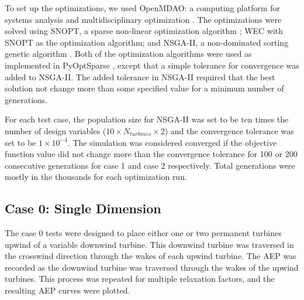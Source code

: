 \documentclass[a4paper]{jpconf}
\begin{document}
To set up the optimizations, we used OpenMDAO: a computing platform for systems analysis and multidisciplinary optimization \cite{gray2010_OpenMDAO}. The optimizations were solved using SNOPT, a sparse non-linear optimization algorithm \cite{gill2005}; WEC with SNOPT as the optimization algorithm; 
and NSGA-II, a non-dominated sorting genetic algorithm \cite{deb2002_nsga2}. Both of the optimization algorithms were used as implemented in PyOptSparse \cite{ruben2012_pyopt}, except that a simple tolerance for convergence was added to NSGA-II. The added tolerance in NSGA-II required that the best solution not change more than some specified value for a minimum number of generations. 

For each test case, the population size for NSGA-II was set to be ten times the number of design variables ($10\times N_{turbines} \times 2$) and the convergence tolerance was set to be $1\times10^{-4}$. The simulation was considered converged if the objective function value did not change more than the convergence tolerance for 100 or 200 consecutive generations for case 1 and case 2 respectively. Total generations were mostly in the thousands for each optimization run.

\subsection{Case 0: Single Dimension}
The case 0 tests were designed to place either one or two permanent turbines upwind of a variable downwind turbine. This downwind turbine was traversed in the crosswind direction through the wakes of each upwind turbine. The AEP was recorded as the downwind turbine was traversed through the wakes of the upwind turbines. This process was repeated for multiple relaxation factors, and the resulting AEP curves were plotted.

\end{document}
